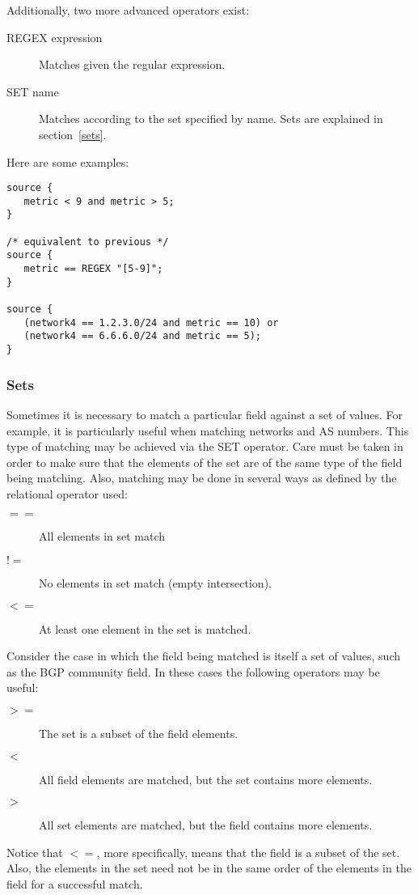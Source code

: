 \documentclass{article}
\begin{document}
Additionally, two more advanced operators exist:
\begin{description}
\item[REGEX expression] Matches given the regular expression.
\item[SET name] Matches according to the set specified by
name. Sets are explained in section~\ref{sets}.
\end{description}

%
%

Here are some examples:
\begin{verbatim}
source {
   metric < 9 and metric > 5;
}

/* equivalent to previous */
source {
   metric == REGEX "[5-9]";
}

source {
   (network4 == 1.2.3.0/24 and metric == 10) or 
   (network4 == 6.6.6.0/24 and metric == 5);
}
\end{verbatim}


\subsubsection{\label{sets}Sets}
Sometimes it is necessary to match a particular field against a set of values.
For example, it is particularly useful when matching networks and AS numbers.
This type of matching may be achieved via the SET operator. Care must be
taken in order to make sure that the elements of the set are of the same type
of the field being matching. Also, matching may be done in several ways as
defined by the relational operator used: 
%  
\begin{description}
\item[$==$] All elements in set match
\item[$!=$] No elements in set match (empty intersection).
\item[$<=$] At least one element in the set is matched.
\end{description}

Consider the case in which the field being matched is itself a set of values,
such as the BGP community field. In these cases the following operators may be
useful:
\begin{description}
\item[$>=$] The set is a subset of the field elements.
\item[$<$] All field elements are matched, but the set contains more elements.
\item[$>$] All set elements are matched, but the field contains more elements.
\end{description}
Notice that $<=$, more specifically, means that the field is a subset of the
set. Also, the elements in the set need not be in the same order of the
elements in the field for a successful match.
\end{document}
